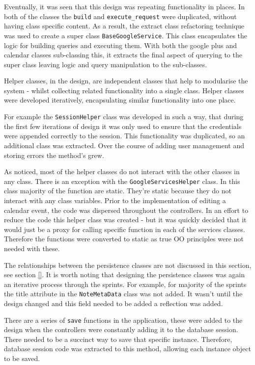 Eventually, it was seen that this design was repeating functionality in places. In both of the classes the \texttt{build} and \texttt{execute_request} were duplicated, without having class specific content. As a result, the extract class refactoring technique was used to create a super class \texttt{BaseGoogleService}. This class encapsulates the logic for building queries and executing them. With both the google plus and calendar classes sub-classing this, it extracts the final aspect of querying to the super class leaving logic and query manipulation to the sub-classes.

Helper classes, in the design, are independent classes that help to modularise the system - whilst collecting related functionality into a single class. Helper classes were developed iteratively, encapsulating similar functionality into one place.

For example the \texttt{SessionHelper} class was developed in such a way, that during the first few iterations of design it was only used to ensure that the credentials were appended correctly to the session. This functionality was duplicated, so an additional class was extracted. Over the course of adding user management and storing errors the method's grew.

As noticed, most of the helper classes do not interact with the other classes in any class. There is an exception with the \texttt{GoogleServicesHelper} class. In this class majority of the function are static.  They're static because they do not interact with any class variables. Prior to the implementation of editing a calendar event, the code was dispersed throughout the controllers. In an effort to reduce the code this helper class was created - but it was quickly decided that it would just be a proxy for calling specific function in each of the services classes. Therefore the functions were converted to static as true OO principles were not needed with these.

The relationships between the persistence classes are not discussed in this section, see section \ref{}. It is worth noting that designing the persistence classes was again an iterative process through the sprints. For example, for majority of the sprints the title attribute in the \texttt{NoteMetaData} class was not added. It wasn't until the design changed and this field needed to be added a reflection was added.

There are a series of \texttt{save} functions in the application, these were added to the design when the controllers were constantly adding it to the database session. There needed to be a succinct way to save that specific instance. Therefore, database session code was extracted to this method, allowing each instance object to be saved.

